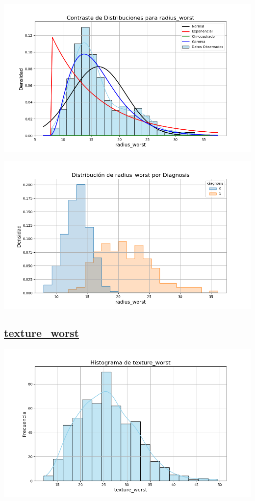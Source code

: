 \documentclass[a4paper, 12pt]{article}
\begin{document}
\includegraphics[width=\textwidth]{../Plots/plots_stats/radius_worst/distribuciones_conocidas_radius_worst.png}

\includegraphics[width=\textwidth]{../Plots/plots_diagnosis/distribucion_radius_worst_por_diagnosis.png}


\subsection*{\underline{texture\_worst}}

	\includegraphics[width=\textwidth]{../Plots/plots_stats/texture_worst/histograma_texture_worst.png}
\end{document}
